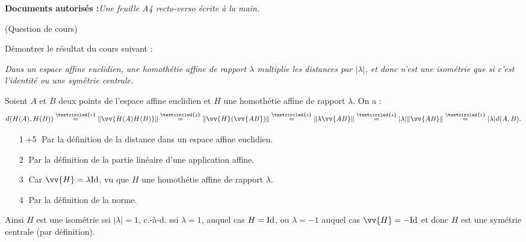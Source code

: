 \documentclass[a4paper,12pt,reqno]{amsart}
\begin{document}
\ifsolutions\else
\textbf{Documents autorisés :}\textit{Une feuille A4 recto-verso écrite à la main.}

\vspace{14mm}
\fi

\begin{exo} (Question de cours)

  Démontrer le résultat du cours suivant :

  \setlength{\leftskip}{1cm}

    \emph{Dans un espace affine euclidien, une homothétie affine de rapport $\lambda$ multiplie les distances par $|\lambda|$, et donc n'est une isométrie que si c'est l'identité ou une symétrie centrale.}

  \setlength{\leftskip}{0cm}
\end{exo}

\begin{solution}
  \newcommand\circled[1]{\textcircled{\scriptsize #1}}
  \newcommand\scriptcircled[1]{\scriptsize\textcircled{\raisebox{-0.3pt}{\tiny #1}}}

  Soient $A$ et $B$ deux points de l'espace affine euclidien et $H$ une homothétie affine de rapport $\lambda$. On a :
    \[
      d(H(A),H(B)) \stackrel{\scriptcircled{1}}{=} \norm{\vv{H(A)H(B)}} \stackrel{\scriptcircled{2}}{=} \norm{\vv{H}(\vv{AB})} \stackrel{\scriptcircled{3}}{=} \norm{\lambda\vv{AB}} \stackrel{\scriptcircled{4}}{=} |\lambda| \norm{\vv{AB}} \stackrel{\scriptcircled{5}}{=} |\lambda| d(A,B).
    \]
    \begin{itemize}[leftmargin=!]
      \item[\circled{1}+\circled{5}] Par la définition de la distance dans un espace affine euclidien.
      \item[\circled{2}] Par la définition de la partie linéaire d'une application affine.
      \item[\circled{3}] Car $\vv{H}=\lambda\id$, vu que $H$ une homothétie affine de rapport $\lambda$.
      \item[\circled{4}] Par la définition de la norme.
    \end{itemize}
    Ainsi $H$ est une isométrie ssi $|\lambda|=1$, c.-à-d. ssi $\lambda=1$, auquel cas $H=\mathrm{Id}$, ou $\lambda=-1$ auquel cas $\vv{H}=-\id$ et donc $H$ est une symétrie centrale (par définition).
\end{solution}
\end{document}
